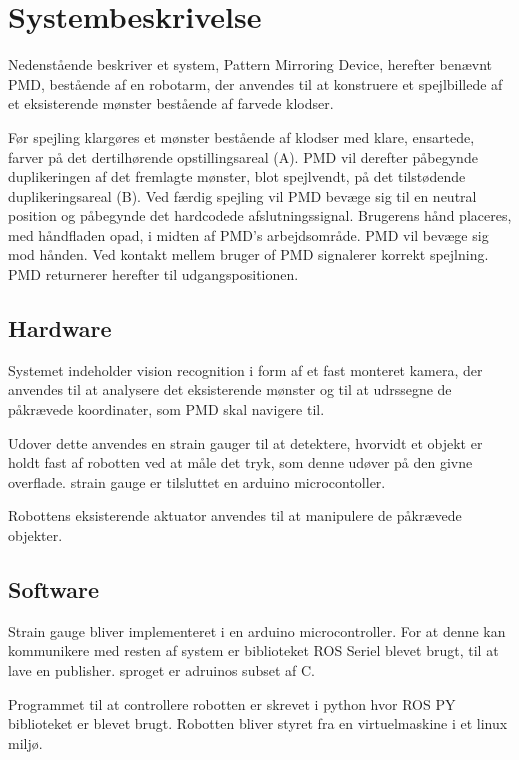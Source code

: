 \chapter{Systembeskrivelse}\label{chap:Systembeskrivelse}
Nedenstående beskriver et system, Pattern Mirroring Device, herefter benævnt PMD, bestående af en
robotarm, der anvendes til at konstruere et spejlbillede af et eksisterende mønster bestående af
farvede klodser.

Før spejling klargøres et mønster bestående af klodser med klare, ensartede, farver på det
dertilhørende opstillingsareal (A).
PMD vil derefter påbegynde duplikeringen af det fremlagte mønster, blot spejlvendt, på det
tilstødende duplikeringsareal (B).
Ved færdig spejling vil PMD bevæge sig til en neutral position og påbegynde det hardcodede
afslutningssignal. Brugerens hånd placeres, med håndfladen opad, i midten af PMD’s
arbejdsområde. PMD vil bevæge sig mod hånden. Ved kontakt
mellem bruger of PMD signalerer korrekt spejlning. PMD returnerer herefter til udgangspositionen.

\section{Hardware}\label{sec:Hardware}
Systemet indeholder vision recognition i form af et fast monteret kamera, der anvendes til at
analysere det eksisterende mønster og til at udrssegne de påkrævede koordinater, som PMD skal
navigere til. 

Udover dette anvendes en strain gauger til at detektere, hvorvidt et objekt er holdt fast af robotten 
ved at måle det tryk, som denne udøver på den givne overflade. strain gauge er tilsluttet en arduino microcontoller.

Robottens eksisterende aktuator anvendes til at manipulere de påkrævede objekter.
\section{Software}\label{sec:Software}
Strain gauge bliver implementeret i en arduino microcontroller. For at denne kan kommunikere med resten af system er
biblioteket ROS Seriel blevet brugt, til at lave en publisher. sproget er adruinos subset af C.

Programmet til at controllere robotten er skrevet i python hvor ROS PY biblioteket er blevet brugt. Robotten bliver styret fra en virtuelmaskine i et linux miljø.